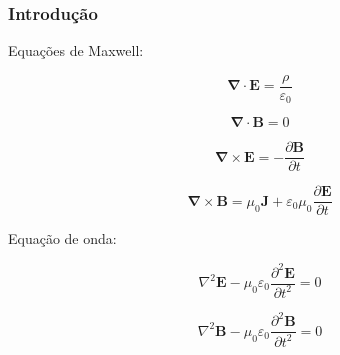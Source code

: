 \documentclass{beamer} %
\begin{document}
\begin{frame}
\frametitle{Introdução}

Equações de Maxwell:

\vspace{0.05\linewidth}

\noindent
\begin{minipage}{.5\linewidth}
\begin{equation}
  \boldsymbol{\nabla} \cdot \mathbf{E} = \frac{\rho}{\varepsilon_0}
\end{equation}
\end{minipage}%
\begin{minipage}{.5\linewidth}
\begin{equation}
 \boldsymbol{\nabla} \cdot \mathbf{B} = 0
\end{equation}
\end{minipage}

\vspace{0.05\linewidth}

\noindent
\begin{minipage}{.5\linewidth}
\begin{equation}
  \boldsymbol{\nabla} \times \mathbf{E} =  -\frac{\partial \mathbf{B}}{\partial t}
\end{equation}
\end{minipage}%
\begin{minipage}{.5\linewidth}
\begin{equation}
 \boldsymbol{\nabla} \times \mathbf{B} = \mu_0 \mathbf{J} + \varepsilon_0 \mu_0 \frac{\partial \mathbf{E}}{\partial t}
\end{equation}
\end{minipage}

\vspace{0.05\linewidth}
Equação de onda:

\vspace{0.05\linewidth}
\noindent
\begin{minipage}{.5\linewidth}
    \begin{equation}
        \nabla^2 \mathbf{E} - \mu_0 \varepsilon_0 \frac{\partial^2 \mathbf{E}}{\partial t^2} = 0
    \end{equation}
\end{minipage}%
\noindent
\begin{minipage}{.5\linewidth}
    \begin{equation}
        \nabla^2 \mathbf{B} - \mu_0 \varepsilon_0 \frac{\partial^2 \mathbf{B}}{\partial t^2} = 0
    \end{equation}
\end{minipage}
\end{frame}
\end{document}
